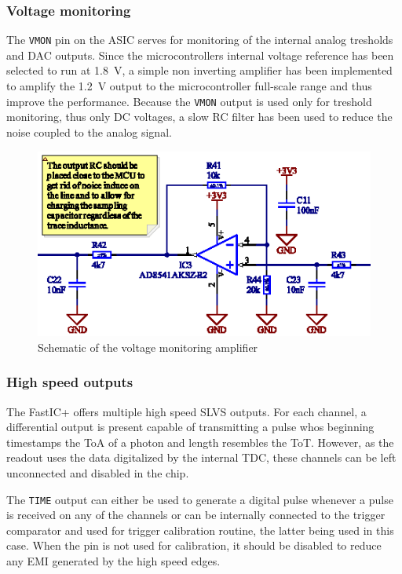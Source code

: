 \documentclass{cernatsnote}
\begin{document}
\subsubsection{Voltage monitoring}
%
The \verb|VMON| pin on the ASIC serves for monitoring of the internal analog tresholds and DAC outputs. Since the microcontrollers internal voltage reference has been selected to run at \SI{1.8}{\volt}, a simple non inverting amplifier has been implemented to amplify the \SI{1.2}{\volt} output to the microcontroller full-scale range and thus improve the performance. Because the \verb|VMON| output is used only for treshold monitoring, thus only DC voltages, a slow RC filter has been used to reduce the noise coupled to the analog signal.
%
\FloatBarrier
\begin{figure}[htp!]
    \centering
    \includegraphics[scale=2]{schematic/fastic_vmon.eps}
    \caption{Schematic of the voltage monitoring amplifier}
    \label{fig:fastic_vmon}
\end{figure}
%
\subsubsection{High speed outputs}
%
The FastIC+ offers multiple high speed SLVS outputs. For each channel, a differential output is present capable of transmitting a pulse whos beginning timestamps the ToA of a photon and length resembles the ToT. However, as the readout uses the data digitalized by the internal TDC, these channels can be left unconnected and disabled in the chip.

The \verb|TIME| output can either be used to generate a digital pulse whenever a pulse is received on any of the channels or can be internally connected to the trigger comparator and used for trigger calibration routine, the latter being used in this case. When the pin is not used for calibration, it should be disabled to reduce any EMI generated by the high speed edges. 
\end{document}
